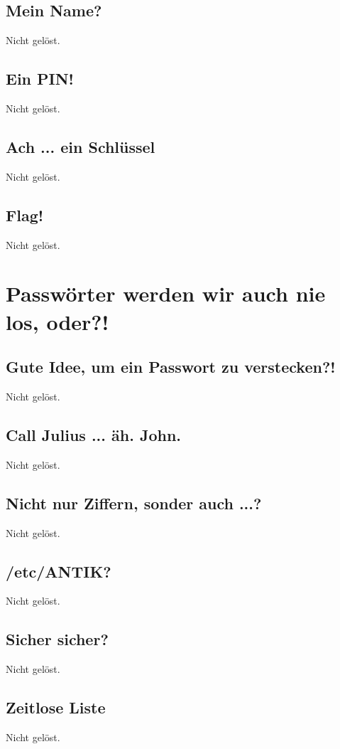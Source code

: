 \documentclass[12pt, a4paper, titlepage, oneside]{scrartcl}
\begin{document}
	\subsection{Mein Name?}
	Nicht gelöst.

	\subsection{Ein PIN!}
	Nicht gelöst.

	\subsection{Ach ... ein Schl\"ussel}
	Nicht gelöst.

	\subsection{Flag!}
	Nicht gelöst.

	\section{Passwörter werden wir auch nie los, oder?!}

	\subsection{Gute Idee, um ein Passwort zu verstecken?!}
	Nicht gelöst.

	\subsection{Call Julius ... äh. John.}
	Nicht gelöst.

	\subsection{Nicht nur Ziffern, sonder auch ...?}
	Nicht gelöst.

	\subsection{/etc/ANTIK?}
	Nicht gelöst.

	\subsection{Sicher sicher?}
	Nicht gelöst.

	\subsection{Zeitlose Liste}
	Nicht gelöst.
\end{document}
